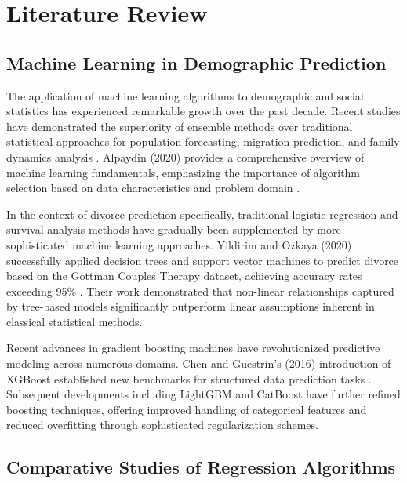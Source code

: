 %
%
\chapter{Literature Review}
\label{chap:literature}
\setlength{\parskip}{1em}

\section{Machine Learning in Demographic Prediction}

The application of machine learning algorithms to demographic and social statistics has experienced remarkable growth over the past decade. Recent studies have demonstrated the superiority of ensemble methods over traditional statistical approaches for population forecasting, migration prediction, and family dynamics analysis \cite{bijak2019machine}. Alpaydin (2020) provides a comprehensive overview of machine learning fundamentals, emphasizing the importance of algorithm selection based on data characteristics and problem domain \cite{alpaydin2020introduction}.

In the context of divorce prediction specifically, traditional logistic regression and survival analysis methods have gradually been supplemented by more sophisticated machine learning approaches. Yildirim and Ozkaya (2020) successfully applied decision trees and support vector machines to predict divorce based on the Gottman Couples Therapy dataset, achieving accuracy rates exceeding 95\% \cite{yildirim2020divorce}. Their work demonstrated that non-linear relationships captured by tree-based models significantly outperform linear assumptions inherent in classical statistical methods.

Recent advances in gradient boosting machines have revolutionized predictive modeling across numerous domains. Chen and Guestrin's (2016) introduction of XGBoost established new benchmarks for structured data prediction tasks \cite{chen2016xgboost}. Subsequent developments including LightGBM \cite{ke2017lightgbm} and CatBoost \cite{prokhorenkova2018catboost} have further refined boosting techniques, offering improved handling of categorical features and reduced overfitting through sophisticated regularization schemes.

\section{Comparative Studies of Regression Algorithms}

